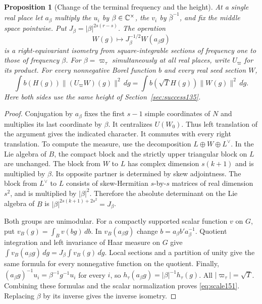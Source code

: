 \documentclass[a4paper,11pt]{article}
\newtheorem{proposition}{Proposition}[section]
\theoremstyle{definition}
\theoremstyle{remark}
\numberwithin{equation}{section}
\begin{document}
\begin{proposition}[Change of the terminal frequency and the height]
\label{prop:scale151}
At a single real place let \(a_\beta\) multiply the \(u_i\)
by \(\beta\in\mathbb C^\times\), the \(v_i\) by
\(\bar\beta^{-1}\), and fix the middle space pointwise. Put
\(J_\beta=|\beta|^{2s(r-s)}\). The operation
\[
          W(g)\longmapsto J_\beta^{-1/2}W(a_\beta g)
\]
is a right-equivariant isometry from square-integrable
sections of frequency one to those of frequency \(\beta\).
For \(\beta=\varpi_\tau\) simultaneously at all real places,
write \(U_\varpi\) for its product. For every nonnegative
Borel function \(b\) and every real seed section \(W\),
\begin{equation}
 \int b(H(g))\|(U_\varpi W)(g)\|^2\,d\dot g
          =\int b(\sqrt T H(g))\|W(g)\|^2\,d\dot g .
     \label{eq:scale151}
\end{equation}
Here both sides use the same height of Section~\ref{sec:success135}.
\end{proposition}
\begin{proof}
Conjugation by \(a_\beta\) fixes the first \(s-1\) simple
coordinates of \(N\) and multiplies its last coordinate by
\(\beta\). It centralizes \(U(W_0)\). Thus left translation
of the argument gives the indicated character. It commutes
with every right translation. To compute the measure, use the
decomposition \(L\oplus W\oplus L^\vee\). In the Lie algebra
of \(B\), the compact block and the strictly upper triangular
block on \(L\) are unchanged. The block from \(W\) to \(L\)
has complex dimension \(s(k+1)\) and is multiplied by
\(\beta\). Its opposite partner is determined by skew
adjointness. The block from \(L^\vee\) to \(L\) consists of
skew-Hermitian \(s\)-by-\(s\) matrices of real dimension
\(s^2\), and is multiplied by \(|\beta|^2\). Therefore the
absolute determinant on the Lie algebra of \(B\) is
\(|\beta|^{2s(k+1)+2s^2}=J_\beta\).

Both groups are unimodular. For a compactly supported scalar
function \(v\) on \(G\), put \(v_B(g)=\int_B v(bg)\,db\).
In \(v_B(a_\beta g)\) change \(b=a_\beta b'a_\beta^{-1}\).
Quotient integration and left invariance of Haar measure on
\(G\) give
\(\int v_B(a_\beta g)\,d\dot g=J_\beta\int v_B(g)\,d\dot g\).
Local sections and a partition of unity give the same formula
for every nonnegative function on the quotient. Finally,
\((a_\beta g)^{-1}u_i=\beta^{-1}g^{-1}u_i\) for every
\(i\), so \(h_\tau(a_\beta g)=|\beta|^{-1}h_\tau(g)\).
All \(|\varpi_\tau|=\sqrt T\). Combining these formulas and
the scalar normalization proves \eqref{eq:scale151}. Replacing
\(\beta\) by its inverse gives the inverse isometry.
\end{proof}
\end{document}
